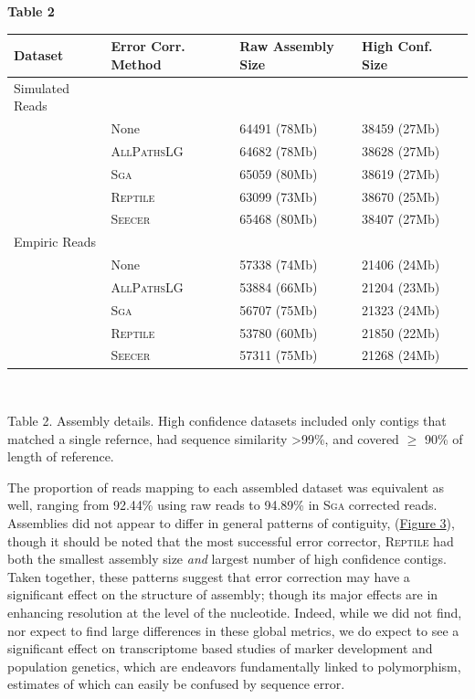 \documentclass[11pt]{article}
\begin{document}
\noindent
\textbf{\hypertarget{Table 2}{Table 2}} \\
\begin{center}
    \begin{tabular}{ | l | l | l  | l | l |}
    \hline
    Dataset & Error Corr. Method &  Raw Assembly Size & High Conf. Size  \\ \hline
    Simulated Reads & & & \\ \hline
     & None & 64491 (78Mb)&38459 (27Mb)  \\ \hline
     & \textsc{AllPathsLG} &64682 (78Mb) & 38628 (27Mb) \\ \hline
     & \textsc{Sga} &65059 (80Mb) & 38619 (27Mb)\\ \hline
     & \textsc{Reptile} &63099 (73Mb) &38670 (25Mb)  \\ \hline
     & \textsc{Seecer} &65468 (80Mb) & 38407 (27Mb) \\ \hline
Empiric Reads & & & \\ \hline
     & None &57338 (74Mb) & 21406 (24Mb)\\ \hline
     & \textsc{AllPathsLG} &53884 (66Mb) & 21204 (23Mb)\\ \hline
     & \textsc{Sga} &56707 (75Mb) & 21323 (24Mb) \\ \hline
     & \textsc{Reptile} &53780 (60Mb) & 21850 (22Mb)\\ \hline
     & \textsc{Seecer} &57311 (75Mb) & 21268 (24Mb) \\ \hline

  \end{tabular}
\\
\end{center}
\noindent
\begin{changemargin}{2cm}{2cm}
Table 2. Assembly details. High confidence datasets included only contigs that matched a single refernce, had sequence similarity \textgreater 99\%, and covered $\geq$ 90\% of length of reference. 
\end{changemargin}

\vspace{10mm}
\noindent
The proportion of reads mapping to each assembled dataset was equivalent as well, ranging from 92.44\% using raw reads to 94.89\% in \textsc{Sga} corrected reads.  Assemblies did not appear to differ in general patterns of contiguity,  (\hyperlink{Figure 3}{Figure 3}), though it should be noted that the most successful error corrector, \textsc{Reptile} had both the smallest assembly size \textit{and} largest number of high confidence contigs.  Taken together, these patterns suggest that error correction may have a significant effect on the structure of assembly; though its major effects are in enhancing resolution at the level of the nucleotide. Indeed, while we did not find, nor expect to find large differences in these global metrics, we do expect to see a significant effect on transcriptome based studies of marker development and population genetics, which are endeavors fundamentally linked to polymorphism, estimates of which can easily be confused by sequence error.    \\
 
\end{document}
